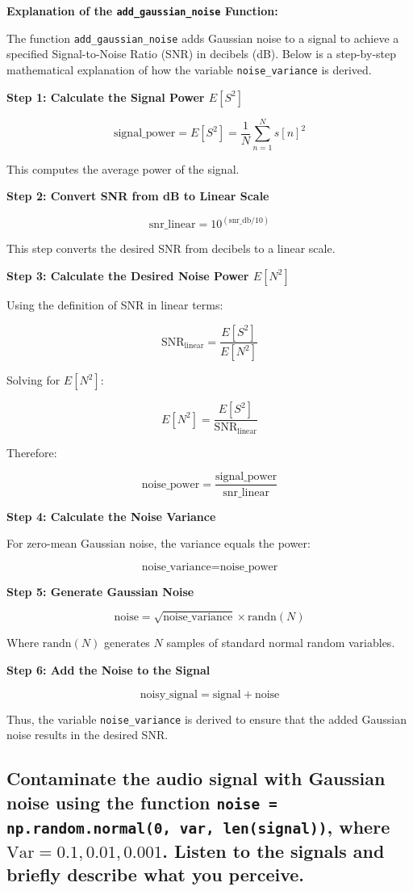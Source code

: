 \documentclass[10pt]{article}
\theoremstyle{definition}
\theoremstyle{remark}
\theoremstyle{definition}
\numberwithin{equation}{prob}
\begin{document}
\textbf{Explanation of the \texttt{add\_gaussian\_noise} Function:}

The function \texttt{add\_gaussian\_noise} adds Gaussian noise to a signal to achieve a specified Signal-to-Noise Ratio (SNR) in decibels (dB). Below is a step-by-step mathematical explanation of how the variable \texttt{noise\_variance} is derived.

\textbf{Step 1: Calculate the Signal Power \( E[S^2] \)}

\[
\text{signal\_power} = E[S^2] = \frac{1}{N} \sum_{n=1}^{N} s[n]^2
\]

This computes the average power of the signal.

\textbf{Step 2: Convert SNR from dB to Linear Scale}

\[
\text{snr\_linear} = 10^{(\text{snr\_db} / 10)}
\]

This step converts the desired SNR from decibels to a linear scale.

\textbf{Step 3: Calculate the Desired Noise Power \( E[N^2] \)}

Using the definition of SNR in linear terms:

\[
\text{SNR}_{\text{linear}} = \frac{E[S^2]}{E[N^2]}
\]

Solving for \( E[N^2] \):

\[
E[N^2] = \frac{E[S^2]}{\text{SNR}_{\text{linear}}}
\]

Therefore:

\[
\text{noise\_power} = \frac{\text{signal\_power}}{\text{snr\_linear}}
\]

\textbf{Step 4: Calculate the Noise Variance}

For zero-mean Gaussian noise, the variance equals the power:

\[
\text{noise\_variance} = \text{noise\_power}
\]

\textbf{Step 5: Generate Gaussian Noise}

\[
\text{noise} = \sqrt{\text{noise\_variance}} \times \text{randn}(N)
\]

Where \(\text{randn}(N)\) generates \( N \) samples of standard normal random variables.

\textbf{Step 6: Add the Noise to the Signal}

\[
\text{noisy\_signal} = \text{signal} + \text{noise}
\]

Thus, the variable \texttt{noise\_variance} is derived to ensure that the added Gaussian noise results in the desired SNR.

\subsection{Contaminate the audio signal with Gaussian noise using the function \texttt{noise = np.random.normal(0, var, len(signal))}, where \( \text{Var} = 0.1, 0.01, 0.001 \). Listen to the signals and briefly describe what you perceive.}
\end{document}
